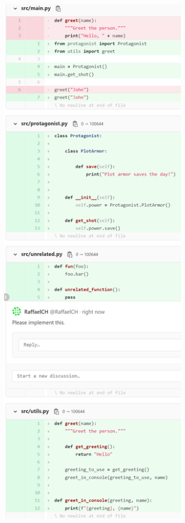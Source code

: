\documentclass[a4paper,11pt,twoside]{article}
\theoremstyle{definition} %
\begin{document}
\begin{figure}
\centering
\begin{subfigure}{.5\textwidth}
  \centering
  \includegraphics[width=1.0\linewidth]{Subfigures/gitlab_example_code.PNG}

\end{subfigure}
\end{figure}
\end{document}
